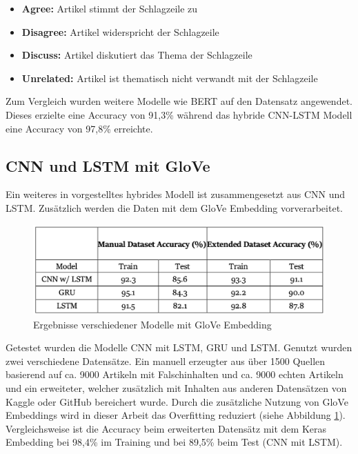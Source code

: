 \begin{itemize}
    \item \textbf{Agree:} Artikel stimmt der Schlagzeile zu
    \item \textbf{Disagree:} Artikel widerspricht der Schlagzeile
    \item \textbf{Discuss:} Artikel diskutiert das Thema der Schlagzeile
    \item \textbf{Unrelated:} Artikel ist thematisch nicht verwandt mit der Schlagzeile
\end{itemize}

Zum Vergleich wurden weitere Modelle wie BERT auf den Datensatz angewendet.
Dieses erzielte eine Accuracy von 91,3\% während das hybride CNN-LSTM Modell eine Accuracy von 97,8\% erreichte.

\subsection{CNN und LSTM mit GloVe}

Ein weiteres in \cite{Buddhadev2025} vorgestelltes hybrides Modell ist zusammengesetzt aus CNN und LSTM. Zusätzlich werden die Daten
mit dem GloVe Embedding vorverarbeitet.

\begin{figure}[htbp]
    \begin{center}
    \includegraphics[scale=0.5]{static/cnn_lstm_glove.png}
    \caption{\label{fig:cnn_lstm_glove} Ergebnisse verschiedener Modelle mit GloVe Embedding \cite{Buddhadev2025}}
    \end{center}
\end{figure}

Getestet wurden die Modelle CNN mit LSTM, GRU und LSTM. Genutzt wurden zwei verschiedene Datensätze. Ein manuell erzeugter aus über 1500 Quellen basierend auf
ca. 9000 Artikeln mit Falschinhalten und ca. 9000 echten Artikeln und ein erweiteter, welcher zusätzlich mit Inhalten aus anderen Datensätzen von Kaggle oder
GitHub bereichert wurde.
Durch die zusätzliche Nutzung von GloVe Embeddings wird in dieser Arbeit das Overfitting reduziert (siehe Abbildung \ref{fig:cnn_lstm_glove}).
Vergleichsweise ist die Accuracy beim erweiterten Datensätz mit dem Keras Embedding bei 98,4\% im Training und bei 89,5\% beim Test (CNN mit LSTM).

